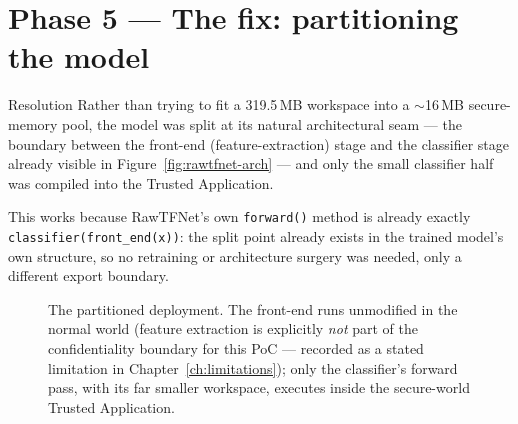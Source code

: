 \documentclass[11pt,a4paper]{report}
\newcommand{\code}[1]{\texttt{\small #1}}
\begin{document}
\section{Phase 5 --- The fix: partitioning the model}
\label{sec:partition}

\begin{resolvedbox}{Resolution}
Rather than trying to fit a 319.5\,MB workspace into a $\sim$16\,MB secure-memory pool, the model
was split at its natural architectural seam --- the boundary between the front-end
(feature-extraction) stage and the classifier stage already visible in Figure~\ref{fig:rawtfnet-arch}
--- and only the small classifier half was compiled into the Trusted Application.
\end{resolvedbox}

This works because RawTFNet's own \code{forward()} method is already exactly
\code{classifier(front\_end(x))}: the split point already exists in the trained model's own
structure, so no retraining or architecture surgery was needed, only a different export boundary.

\begin{figure}[H]
\centering
{}
\caption{The partitioned deployment. The front-end runs unmodified in the normal world (feature
extraction is explicitly \emph{not} part of the confidentiality boundary for this PoC --- recorded
as a stated limitation in Chapter~\ref{ch:limitations}); only the classifier's forward pass, with
its far smaller workspace, executes inside the secure-world Trusted Application.}
\label{fig:partition}
\end{figure}
\end{document}
